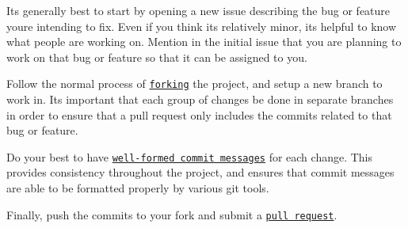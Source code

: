 \begin{DoxyEnumerate}
\item It\textquotesingle{}s generally best to start by opening a new issue describing the bug or feature you\textquotesingle{}re intending to fix. Even if you think it\textquotesingle{}s relatively minor, it\textquotesingle{}s helpful to know what people are working on. Mention in the initial issue that you are planning to work on that bug or feature so that it can be assigned to you.
\end{DoxyEnumerate}
\begin{DoxyEnumerate}
\item Follow the normal process of \href{https://help.github.com/articles/fork-a-repo}{\tt forking} the project, and setup a new branch to work in. It\textquotesingle{}s important that each group of changes be done in separate branches in order to ensure that a pull request only includes the commits related to that bug or feature.
\end{DoxyEnumerate}
\begin{DoxyEnumerate}
\item Do your best to have \href{http://tbaggery.com/2008/04/19/a-note-about-git-commit-messages.html}{\tt well-\/formed commit messages} for each change. This provides consistency throughout the project, and ensures that commit messages are able to be formatted properly by various git tools.
\end{DoxyEnumerate}
\begin{DoxyEnumerate}
\item Finally, push the commits to your fork and submit a \href{https://help.github.com/articles/creating-a-pull-request}{\tt pull request}. 
\end{DoxyEnumerate}